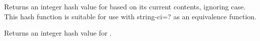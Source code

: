 \begin{entry}{}

Returns an integer hash value for  based on
its current contents, ignoring case.
This hash function is suitable
for use with {\cf string-ci=?} as an equivalence function.
\end{entry}

\begin{entry}{}

Returns an integer hash value for .
\end{entry}

